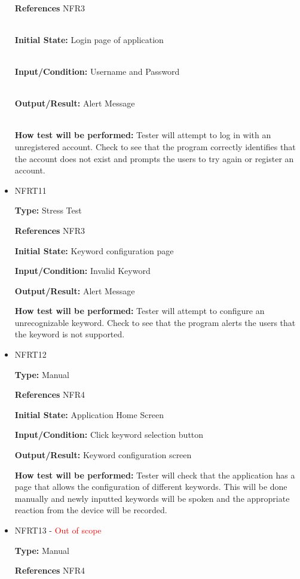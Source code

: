 \documentclass[12pt, titlepage]{article}
\begin{document}
\begin{itemize}
{\\\textbf{References} NFR3
					
\\\textbf{Initial State:} Login page of application
					
\\\textbf{Input/Condition:} Username and Password
					
\\\textbf{Output/Result:} Alert Message
					
\\\textbf{How test will be performed:} Tester will attempt to log in with an unregistered account. Check to see that the program correctly identifies that the account does not exist and prompts the users to try again or register an account.
}
\item{NFRT11}

\textbf{Type:} Stress Test

\textbf{References} NFR3
					
\textbf{Initial State:} Keyword configuration page
					
\textbf{Input/Condition:} Invalid Keyword
					
\textbf{Output/Result:} Alert Message
					
\textbf{How test will be performed:} Tester will attempt to configure an unrecognizable keyword. Check to see that the program alerts the users that the keyword is not supported. 

\item{NFRT12} 

\textbf{Type:} Manual

\textbf{References} NFR4
					
\textbf{Initial State:} Application Home Screen
					
\textbf{Input/Condition:} Click keyword selection button
					
\textbf{Output/Result:} Keyword configuration screen
					
\textbf{How test will be performed:} Tester will check that the application has a page that allows the configuration of different keywords. This will be done manually and newly inputted keywords will be spoken and the appropriate reaction from the device will be recorded. 

\item{NFRT13 - \textcolor{red}{Out of scope}}

\textbf{Type:} Manual

\textbf{References} NFR4
					

\end{itemize}
\end{document}

